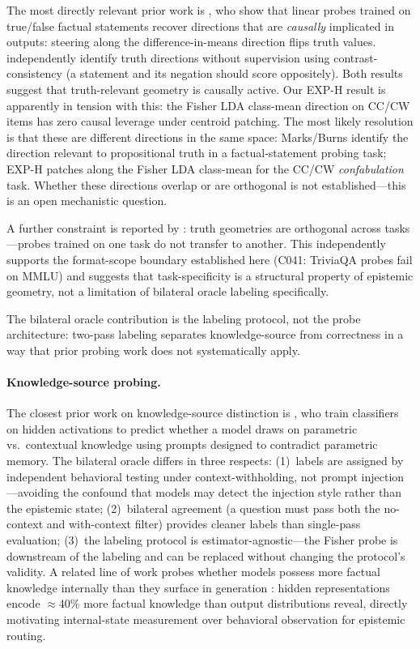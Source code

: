 \documentclass[11pt]{article}
\begin{document}
The most directly relevant prior work is \citet{marks2023truth}, who show that linear
probes trained on true/false factual statements recover directions that are
\emph{causally} implicated in outputs: steering along the difference-in-means direction
flips truth values. \citet{burns2023ccs} independently identify truth directions without
supervision using contrast-consistency (a statement and its negation should score
oppositely). Both results suggest that truth-relevant geometry is causally active.
Our EXP-H result is apparently in tension with this: the Fisher LDA class-mean
direction on CC/CW items has zero causal leverage under centroid patching. The most
likely resolution is that these are different directions in the same space: Marks/Burns
identify the direction relevant to propositional truth in a factual-statement probing
task; EXP-H patches along the Fisher LDA class-mean for the CC/CW \emph{confabulation}
task. Whether these directions overlap or are orthogonal is not established---this is an
open mechanistic question.

A further constraint is reported by \citet{azizian2025orthogonal}: truth geometries
are orthogonal across tasks---probes trained on one task do not transfer to another.
This independently supports the format-scope boundary established here (C041:
TriviaQA probes fail on MMLU) and suggests that task-specificity is a structural
property of epistemic geometry, not a limitation of bilateral oracle labeling
specifically.

The bilateral oracle contribution is the labeling protocol, not the probe
architecture: two-pass labeling separates knowledge-source from correctness in a way
that prior probing work does not systematically apply.

\paragraph{Knowledge-source probing.}
The closest prior work on knowledge-source distinction is \citet{tighidet2024knowledge},
who train classifiers on hidden activations to predict whether a model draws on
parametric vs.\ contextual knowledge using prompts designed to contradict parametric
memory.
The bilateral oracle differs in three respects: (1)~labels are assigned by independent
behavioral testing under context-withholding, not prompt injection---avoiding the
confound that models may detect the injection style rather than the epistemic state;
(2)~bilateral agreement (a question must pass both the no-context and with-context
filter) provides cleaner labels than single-pass evaluation; (3)~the labeling protocol
is estimator-agnostic---the Fisher probe is downstream of the labeling and can be
replaced without changing the protocol's validity.
A related line of work probes whether models possess more factual knowledge internally
than they surface in generation \citep{insideout2025}: hidden representations encode
$\approx$40\% more factual knowledge than output distributions reveal, directly
motivating internal-state measurement over behavioral observation for epistemic routing.
\end{document}

